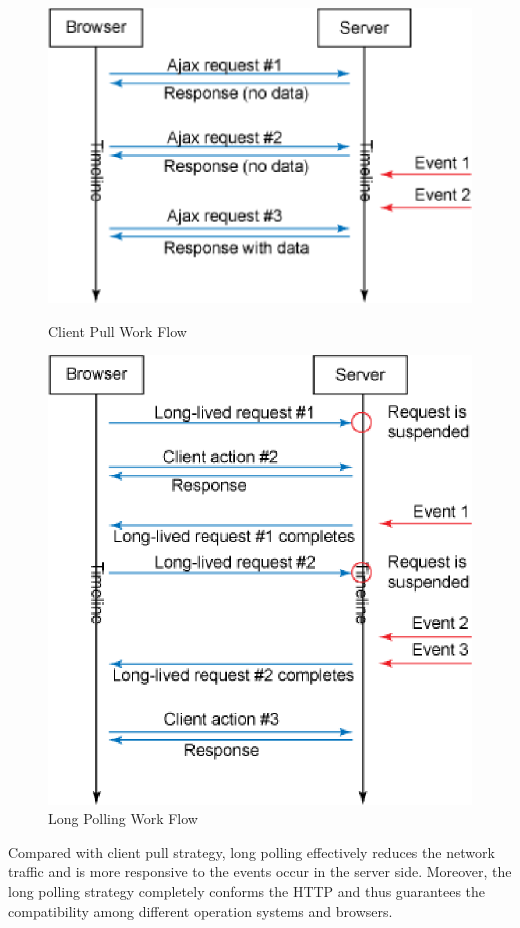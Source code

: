 \begin{figure}[htb!]
\centering
    \includegraphics[scale=0.70]{figures/client_pull.eps}
    \caption{Client Pull Work Flow}
    \label{fig:client_pull}
    \includegraphics[scale=0.70]{figures/long_polling.eps}
    \caption{Long Polling Work Flow}
    \label{fig:long_polling}
\end{figure}


Compared with client pull strategy, long polling effectively reduces the network 
traffic and is more responsive to the events occur in the server side. Moreover, 
the long polling strategy completely conforms the HTTP and thus guarantees 
the compatibility among different operation systems and browsers.

